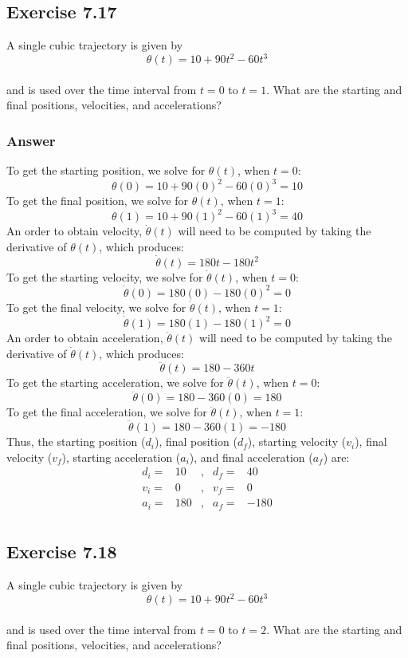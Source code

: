 \documentclass[10pt]{article}
\begin{document}
\subsection*{Exercise 7.17}
A single cubic trajectory is given by \\
\[
\theta(t) = 10 + 90t^2 - 60t^3
\]
\\
and is used over the time interval from \(t = 0\) to \(t = 1\). What are the starting and final positions, velocities, and accelerations?
\subsubsection*{Answer}
To get the starting position, we solve for \(\theta(t)\), when \(t = 0\):
\[\theta(0) = 10 + 90(0)^2 - 60(0)^3 = 10\]
To get the final position, we solve for \(\theta(t)\), when \(t = 1\):
\[\theta(1) = 10 + 90(1)^2 - 60(1)^3 = 40\]
An order to obtain velocity, \(\dot{\theta}(t)\) will need to be computed by taking the derivative of \(\theta(t)\), which produces:
\[\dot{\theta}(t) = 180t - 180t^2\]
To get the starting velocity, we solve for \(\dot{\theta}(t)\), when \(t = 0\):
\[\dot{\theta}(0) = 180(0) - 180(0)^2 = 0\]
To get the final velocity, we solve for \(\dot{\theta}(t)\), when \(t = 1\):
\[\dot{\theta}(1) = 180(1) - 180(1)^2 = 0\]
An order to obtain acceleration, \(\ddot{\theta}(t)\) will need to be computed by taking the derivative of \(\dot{\theta}(t)\), which produces:
\[\ddot{\theta}(t) = 180 - 360t\]
To get the starting acceleration, we solve for \(\ddot{\theta}(t)\), when \(t = 0\):
\[\ddot{\theta}(0) = 180 - 360(0) = 180\]
To get the final acceleration, we solve for \(\ddot{\theta}(t)\), when \(t = 1\):
\[\ddot{\theta}(1) = 180 - 360(1) = -180\]
Thus, the starting position (\(d_i\)), final position (\(d_f\)), starting velocity (\(v_i\)), final velocity (\(v_f\)), starting acceleration (\(a_i\)), and final acceleration (\(a_f\)) are:
\[
\begin{array}{lrllr}
    d_i = &10 &,& d_f = &40  \\
    v_i = &0  &,& v_f = &0   \\
    a_i = &180 &,& a_f = &-180 \\
\end{array}
\]
\pagebreak
\subsection*{Exercise 7.18}
A single cubic trajectory is given by \\
\[
\theta(t) = 10 + 90t^2 - 60t^3
\]
\\
and is used over the time interval from \(t = 0\) to \(t = 2\). What are the starting and final positions, velocities, and accelerations?
\end{document}
